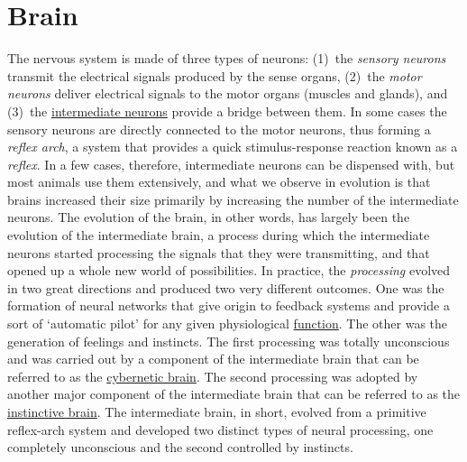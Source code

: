 \documentclass[12pt]{article}
\begin{document}
\section{Brain}
The nervous system is made of three types of neurons: (1)~the \textit{sensory neurons} transmit the electrical signals produced by the sense organs, (2)~the \textit{motor neurons} deliver electrical signals to the motor organs (muscles and glands), and (3)~the \hyperlink{intermediate_brain}{intermediate neurons} provide a bridge between them. In some cases the sensory neurons are directly connected to the motor neurons, thus forming a \textit{reflex arch}, a system that provides a quick stimulus-response reaction known as a \textit{reflex}. In a few cases, therefore, intermediate neurons can be dispensed with, but most animals use them extensively, and what we observe in evolution is that brains increased their size primarily by increasing the number of the intermediate neurons. The evolution of the brain, in other words, has largely been the evolution of the intermediate brain, a process during which the intermediate neurons started processing the signals that they were transmitting, and that opened up a whole new world of possibilities. In practice, the \textit{processing} evolved in two great directions and produced two very different outcomes. One was the formation of neural networks that give origin to feedback systems and provide a sort of `automatic pilot' for any given physiological \hyperlink{function}{function}. The other was the generation of feelings and instincts. The first processing was totally unconscious and was carried out by a component of the intermediate brain that can be referred to as the \hyperlink{cybernetic_brain}{cybernetic brain}. The second processing was adopted by another major component of the intermediate brain that can be referred to as the \hyperlink{instinctive_brain}{instinctive brain}. The intermediate brain, in short, evolved from a primitive reflex-arch system and developed two distinct types of neural processing, one completely unconscious and the second controlled by instincts. 
 

\hypertarget{brain_as_a_modelling_system}{}
\end{document}
